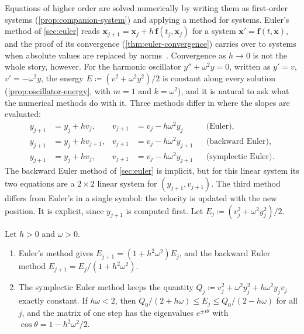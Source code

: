 Equations of higher order are solved numerically by writing them as first-order systems (\cref{prop:companion-system}) and applying a method for systems. Euler's method of \cref{sec:euler} reads $\mathbf x_{j+1}=\mathbf x_j+h\,\mathbf f(t_j,\mathbf x_j)$ for a system $\mathbf x'=\mathbf f(t,\mathbf x)$, and the proof of its convergence (\cref{thm:euler-convergence}) carries over to systems when absolute values are replaced by norms~\cite[Chap.~II]{hairer1993}. Convergence as $h\to0$ is not the whole story, however. For the harmonic oscillator $y''+\omega^2y=0$, written as $y'=v$, $v'=-\omega^2y$, the energy $E\coloneqq(v^2+\omega^2y^2)/2$ is constant along every solution (\cref{prop:oscillator-energy}, with $m=1$ and $k=\omega^2$), and it is natural to ask what the numerical methods do with it. Three methods differ in where the slopes are evaluated:
\begin{align*}
y_{j+1}&=y_j+hv_j, & v_{j+1}&=v_j-h\omega^2y_j &&\text{(Euler)},\\
y_{j+1}&=y_j+hv_{j+1}, & v_{j+1}&=v_j-h\omega^2y_{j+1} &&\text{(backward Euler)},\\
y_{j+1}&=y_j+hv_j, & v_{j+1}&=v_j-h\omega^2y_{j+1} &&\text{(symplectic Euler)}.
\end{align*}
The backward Euler method of \cref{sec:euler} is implicit, but for this linear system its two equations are a $2\times2$ linear system for $(y_{j+1},v_{j+1})$. The third method differs from Euler's in a single symbol: the velocity is updated with the new position. It is explicit, since $y_{j+1}$ is computed first. Let $E_j\coloneqq(v_j^2+\omega^2y_j^2)/2$.

\begin{proposition}
\label{prop:discrete-energy}
Let $h>0$ and $\omega>0$.
\begin{enumerate}
\item Euler's method gives $E_{j+1}=(1+h^2\omega^2)E_j$, and the backward Euler method $E_{j+1}=E_j/(1+h^2\omega^2)$.
\item The symplectic Euler method keeps the quantity $Q_j\coloneqq v_j^2+\omega^2y_j^2+h\omega^2y_jv_j$ exactly constant. If $h\omega<2$, then $Q_0/(2+h\omega)\le E_j\le Q_0/(2-h\omega)$ for all $j$, and the matrix of one step has the eigenvalues $e^{\pm i\theta}$ with $\cos\theta=1-h^2\omega^2/2$.
\end{enumerate}
\end{proposition}

